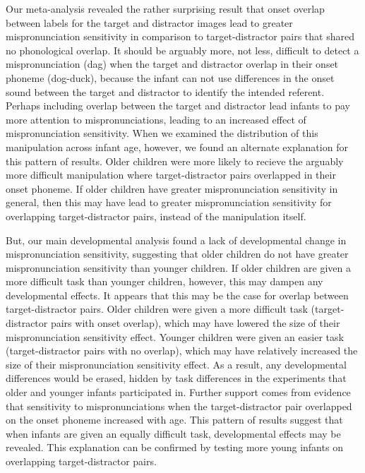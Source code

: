 \documentclass[man]{apa6}
\theoremstyle{definition}
\theoremstyle{definition}
\theoremstyle{definition}
\theoremstyle{remark}
\begin{document}
Our meta-analysis revealed the rather surprising result that onset
overlap between labels for the target and distractor images lead to
greater mispronunciation sensitivity in comparison to target-distractor
pairs that shared no phonological overlap. It should be arguably more,
not less, difficult to detect a mispronunciation (dag) when the target
and distractor overlap in their onset phoneme (dog-duck), because the
infant can not use differences in the onset sound between the target and
distractor to identify the intended referent. Perhaps including overlap
between the target and distractor lead infants to pay more attention to
mispronunciations, leading to an increased effect of mispronunciation
sensitivity. When we examined the distribution of this manipulation
across infant age, however, we found an alternate explanation for this
pattern of results. Older children were more likely to recieve the
arguably more difficult manipulation where target-distractor pairs
overlapped in their onset phoneme. If older children have greater
mispronunciation sensitivity in general, then this may have lead to
greater mispronunciation sensitivity for overlapping target-distractor
pairs, instead of the manipulation itself.

But, our main developmental analysis found a lack of developmental
change in mispronunciation sensitivity, suggesting that older children
do not have greater mispronunciation sensitivity than younger children.
If older children are given a more difficult task than younger children,
however, this may dampen any developmental effects. It appears that this
may be the case for overlap between target-distractor pairs. Older
children were given a more difficult task (target-distractor pairs with
onset overlap), which may have lowered the size of their
mispronunciation sensitivity effect. Younger children were given an
easier task (target-distractor pairs with no overlap), which may have
relatively increased the size of their mispronunciation sensitivity
effect. As a result, any developmental differences would be erased,
hidden by task differences in the experiments that older and younger
infants participated in. Further support comes from evidence that
sensitivity to mispronunciations when the target-distractor pair
overlapped on the onset phoneme increased with age. This pattern of
results suggest that when infants are given an equally difficult task,
developmental effects may be revealed. This explanation can be confirmed
by testing more young infants on overlapping target-distractor pairs.
\end{document}
